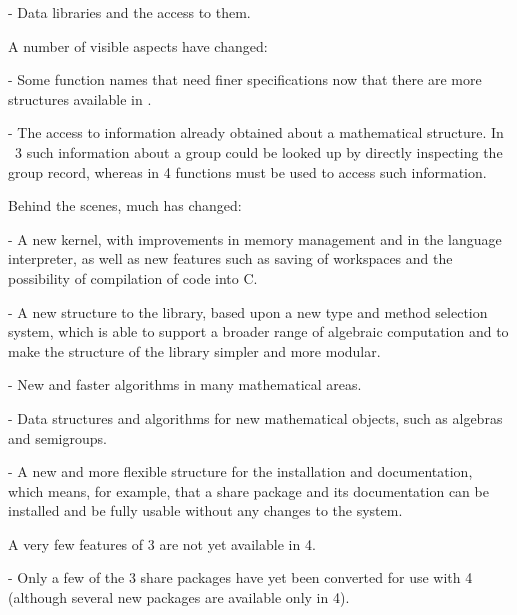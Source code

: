   \item{-}
    Data libraries and the access to them.
\endlist

A number of visible aspects have changed:

\beginlist
  \item{-}
    Some function names that need finer specifications now that there are
    more structures available in {\GAP}.

  \item{-}  
    The    access to information   already  obtained about a mathematical
    structure. In {\GAP}~3 such information about a group could be looked
    up  by  directly inspecting  the  group record,  whereas in  {\GAP} 4
    functions must be used to access such information.
\endlist

Behind the scenes, much has changed: 

\beginlist
  \item{-} A new kernel,  with improvements in  memory management  and in
  the language interpreter, as well  as new  features  such as saving  of
  workspaces and the possibility of compilation of {\GAP} code into C.

  \item{-} A new structure   to the library, based  upon  a new  type and
  method  selection system, which  is able to  support a broader range of
  algebraic computation and to make the  structure of the library simpler
  and more modular.

  \item{-}
    New and faster algorithms in many mathematical areas.

  \item{-} 
    Data structures and algorithms for new mathematical objects, such as
    algebras and semigroups.

  \item{-} A new and more flexible structure  for the {\GAP} installation
  and documentation, which  means, for example, that  a share package and
  its documentation can be installed and be fully usable without any changes
  to the {\GAP} system.
\endlist

A very few features of {\GAP} 3 are not yet available in  {\GAP} 4.

\beginlist
   \item{-}
     Only a few of the {\GAP} 3 share packages have yet been converted
     for use with  {\GAP} 4 (although several new packages are available
     only in  {\GAP} 4). 

